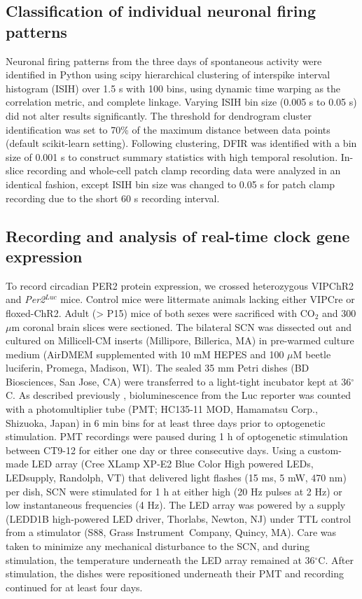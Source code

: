 \subsection*{Classification of individual neuronal firing patterns}
Neuronal firing patterns from the three days of spontaneous activity were identified in Python using scipy hierarchical clustering of interspike interval histogram (ISIH) over 1.5 s with 100 bins, using dynamic time warping \cite{Salvador2007} as the correlation metric, and complete linkage.
Varying ISIH bin size (0.005 s to 0.05 s) did not alter results significantly. 
The threshold for dendrogram cluster identification was set to 70\% of the maximum distance between data points (default scikit-learn setting). Following clustering, DFIR was identified with a bin size of 0.001 s to construct summary statistics with high temporal resolution. In-slice recording and whole-cell patch clamp recording data were analyzed in an identical fashion, except ISIH bin size was changed to 0.05 s for patch clamp recording due to the short 60 s recording interval. 

\subsection*{Recording and analysis of real-time clock gene expression} 
To record circadian PER2 protein expression, we crossed heterozygous VIPChR2 and \textit{Per2}$^{Luc}$ mice.
Control mice were littermate animals lacking either VIPCre or floxed-ChR2.
Adult (> P15) mice of both sexes were sacrificed with CO$_2$ and 300 $\mu$m coronal brain slices were sectioned.
The bilateral SCN was dissected out and cultured on Millicell-CM inserts (Millipore, Billerica, MA) in pre-warmed culture medium (AirDMEM supplemented with 10 mM HEPES and 100 $\mu$M beetle luciferin, Promega, Madison, WI).
The sealed 35 mm Petri dishes (BD Biosciences, San Jose, CA) were transferred to a light-tight incubator kept at 36$^\circ$C. As described previously \cite{Freeman2013a, Aton2005}, bioluminescence from the Luc reporter was counted with a photomultiplier tube (PMT; HC135-11 MOD, Hamamatsu Corp., Shizuoka, Japan) in 6 min bins for at least three days prior to optogenetic stimulation.
PMT recordings were paused during 1 h of optogenetic stimulation between CT9-12 for either one day or three consecutive days.
Using a custom-made LED array (Cree XLamp XP-E2 Blue Color High powered LEDs, LEDsupply, Randolph, VT) that delivered light flashes (15 ms, 5 mW, 470 nm) per dish, SCN were stimulated for 1 h at either high (20 Hz pulses at 2 Hz) or low instantaneous frequencies (4 Hz).
The LED array was powered by a supply (LEDD1B high-powered LED driver, Thorlabs, Newton, NJ) under TTL control from a stimulator (S88, Grass Instrument Company, Quincy, MA).
Care was taken to minimize any mechanical disturbance to the SCN, and during stimulation, the temperature underneath the LED array remained at 36$^\circ$C. After stimulation, the dishes were repositioned underneath their PMT and recording continued for at least four days.

